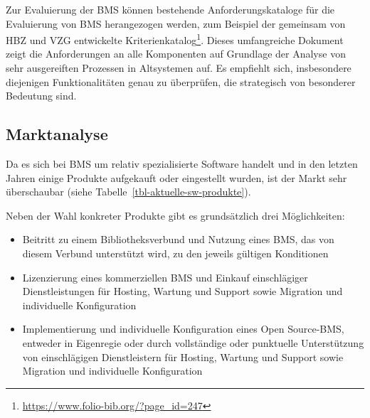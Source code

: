 \documentclass[
  11pt,
  letterpaper,
  DIV=11,
  twoside]{scrreprt}
\DeclareRobustCommand{\href}[2]{#2\footnote{\url{#1}}}
\begin{document}
Zur Evaluierung der BMS können bestehende Anforderungskataloge für die
Evaluierung von BMS herangezogen werden, zum Beispiel der gemeinsam
\href{https://www.folio-bib.org/?page_id=247}{von HBZ und VZG
entwickelte Kriterienkatalog}. Dieses umfangreiche Dokument zeigt die
Anforderungen an alle Komponenten auf Grundlage der Analyse von sehr
ausgereiften Prozessen in Altsystemen auf. Es empfiehlt sich,
insbesondere diejenigen Funktionalitäten genau zu überprüfen, die
strategisch von besonderer Bedeutung sind.

\subsection{Marktanalyse}\label{marktanalyse}

Da es sich bei BMS um relativ spezialisierte Software handelt und in den
letzten Jahren einige Produkte aufgekauft oder eingestellt wurden, ist
der Markt sehr überschaubar (siehe
Tabelle~\ref{tbl-aktuelle-sw-produkte}).

Neben der Wahl konkreter Produkte gibt es grundsätzlich drei
Möglichkeiten:

\begin{itemize}
\item
  Beitritt zu einem Bibliotheksverbund und Nutzung eines BMS, das von
  diesem Verbund unterstützt wird, zu den jeweils gültigen Konditionen
\item
  Lizenzierung eines kommerziellen BMS und Einkauf einschlägiger
  Dienstleistungen für Hosting, Wartung und Support sowie Migration und
  individuelle Konfiguration
\item
  Implementierung und individuelle Konfiguration eines Open Source-BMS,
  entweder in Eigenregie oder durch vollständige oder punktuelle
  Unterstützung von einschlägigen Dienstleistern für Hosting, Wartung
  und Support sowie Migration und individuelle Konfiguration
\end{itemize}
\end{document}
